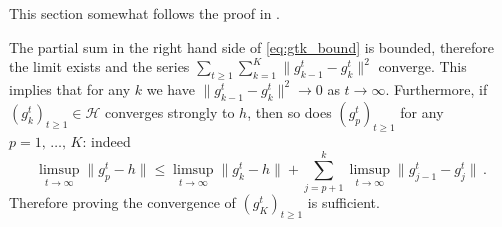 \documentclass[a4paper]{article}
\newcommand{\Hcal}{\mathcal{H}}
\begin{document}
This section somewhat follows the proof in \cite{boyledykstra1986}.

The partial sum in the right hand side of \eqref{eq:gtk_bound} is bounded, therefore
the limit exists and the series $\sum_{t\geq 1} \sum_{k=1}^K \| g^t_{k-1} - g^t_k \|^2$
converge. This implies that for any $k$ we have $\|g^t_{k-1} - g^t_k\|^2 \to 0$ as
$t\to \infty$. Furthermore, if $(g^t_k)_{t\geq 1}\in \Hcal$ converges strongly to
$h$, then so does $(g^t_p)_{t\geq 1}$ for any $p=1,\,\ldots,\,K$: indeed
\begin{equation*}
  \limsup_{t\to \infty} \| g^t_p - h \|
    \leq \limsup_{t\to \infty} \|g^t_k - h\|
      + \sum_{j=p+1}^k \limsup_{t\to \infty} \| g^t_{j-1} - g^t_j \|
    \,.
\end{equation*}
Therefore proving the convergence of $(g^t_K)_{t\geq 1}$ is sufficient.
\end{document}
